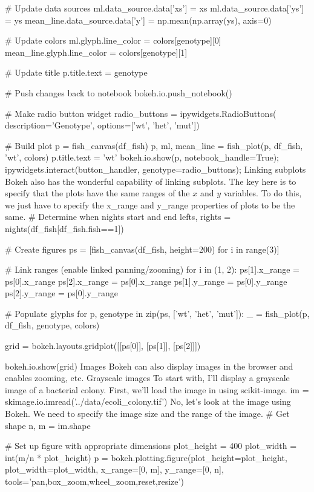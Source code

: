     # Update data sources
    ml.data_source.data['xs'] = xs
    ml.data_source.data['ys'] = ys
    mean_line.data_source.data['y'] = np.mean(np.array(ys), axis=0)
    
    # Update colors
    ml.glyph.line_color = colors[genotype][0]
    mean_line.glyph.line_color = colors[genotype][1]
    
    # Update title
    p.title.text = genotype

    # Push changes back to notebook
    bokeh.io.push_notebook()

# Make radio button widget
radio_buttons = ipywidgets.RadioButtons(
    description='Genotype', options=['wt', 'het', 'mut'])
    
# Build plot
p = fish_canvas(df_fish)
p, ml, mean_line = fish_plot(p, df_fish, 'wt', colors)
p.title.text = 'wt'
bokeh.io.show(p, notebook_handle=True);
ipywidgets.interact(button_handler, genotype=radio_buttons);
Linking subplots
Bokeh also has the wonderful capability of linking subplots. The key here is to specify that the plots have the same ranges of the $x$ and $y$ variables. To do this, we just have to specify the x_range and y_range properties of plots to be the same.
# Determine when nights start and end
lefts, rights = nights(df_fish[df_fish.fish==1])

# Create figures
ps = [fish_canvas(df_fish, height=200) for i in range(3)] 

# Link ranges (enable linked panning/zooming)
for i in (1, 2):
    ps[1].x_range = ps[0].x_range
    ps[2].x_range = ps[0].x_range
    ps[1].y_range = ps[0].y_range
    ps[2].y_range = ps[0].y_range
        
# Populate glyphs
for p, genotype in zip(ps, ['wt', 'het', 'mut']):
    _ = fish_plot(p, df_fish, genotype, colors)
    
grid = bokeh.layouts.gridplot([[ps[0]], [ps[1]], [ps[2]]])

bokeh.io.show(grid)
Images
Bokeh can also display images in the browser and enables zooming, etc.
Grayscale images
To start with, I'll display a grayscale image of a bacterial colony. First, we'll load the image in using scikit-image.
im = skimage.io.imread('../data/ecoli_colony.tif')
No, let's look at the image using Bokeh. We need to specify the image size and the range of the image.
# Get shape
n, m = im.shape

# Set up figure with appropriate dimensions
plot_height = 400
plot_width = int(m/n * plot_height)
p = bokeh.plotting.figure(plot_height=plot_height, plot_width=plot_width, 
                          x_range=[0, m], y_range=[0, n],
                          tools='pan,box_zoom,wheel_zoom,reset,resize')

